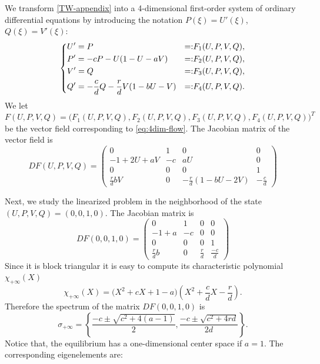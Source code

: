 \documentclass[11pt,a4paper]{article}
\numberwithin{equation}{section}
\numberwithin{figure}{section}
\begin{document}
We transform \eqref{TW-appendix} into a 4-dimensional first-order system of ordinary differential equations by introducing the notation $P(\xi)=U'(\xi)$, $Q(\xi)=V'(\xi)$:
\begin{equation}\label{eq:4dim-flow}
    \left\{\begin{aligned}\relax
        &U'=P  &                    =:&F_1(U, P, V, Q), \\ 
        &P'=-cP-U(1-U-aV)&              =:&F_2(U, P, V, Q), \\ 
        &V'=Q        &          =:&F_3(U, P, V, Q), \\ 
        &Q'=-\frac{c}{d}Q-\frac{r}{d}V(1-bU-V)& =:&F_4(U, P, V, Q).
    \end{aligned}\right.
\end{equation}
We let $F(U, P, V, Q) = \big(F_1(U, P, V, Q),F_2(U, P, V, Q),F_3(U, P, V, Q), F_4(U, P, V, Q)\big)^T$ be the vector field corresponding to \eqref{eq:4dim-flow}. 
The Jacobian matrix of the vector field is
\begin{equation*}
    DF(U,P,V,Q) = \left(\begin{matrix}
        0 & 1 & 0 & 0 \\ 
        -1+2U+aV & -c & aU & 0 \\
        0 & 0 & 0 & 1 \\
        \frac{r}{d}bV & 0 & -\frac{r}{d}(1-bU-2V) & -\frac{c}{d} 
    \end{matrix}\right)
\end{equation*}

Next, we study the linearized problem in the neighborhood of the state $(U, P, V, Q)=(0, 0, 1, 0)$. The Jacobian matrix is 
\begin{equation}\label{eq:Jacobian-invaded}
    DF(0, 0, 1, 0) = \begin{pmatrix}
        0 & 1 & 0 & 0 \\ 
        -1+a & -c & 0 & 0 \\ 
        0 & 0 & 0 & 1 \\ 
        \frac{r}{d}b & 0 & \frac{r}{d} & \frac{-c}{d}
    \end{pmatrix}
\end{equation}
Since it is  block triangular it is easy to compute its characteristic polynomial $\chi_{+\infty}(X)$
\begin{equation}\label{kkkk}
    \chi_{+\infty}(X) = \big(X^2+cX+1-a\big)\left(X^2+\frac{c}{d}X-\frac{r}{d}\right).
\end{equation}
Therefore the spectrum of the matrix $ DF(0, 0, 1, 0)$ is 
\begin{equation*}
    \sigma_{+\infty} = \left\{\dfrac{-c\pm\sqrt{c^2+4(a-1)}}{2},\dfrac{-c\pm\sqrt{c^2+4rd}}{2d}\right\}. 
\end{equation*}
Notice that,  the equilibrium has a one-dimensional center space if $a=1$. 
The corresponding eigenelements are: \medskip
\end{document}
